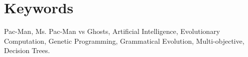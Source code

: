 \chapter{Keywords}
Pac-Man, Ms. Pac-Man vs Ghosts, Artificial Intelligence, Evolutionary Computation, Genetic Programming, Grammatical Evolution, Multi-objective, Decision Trees.
